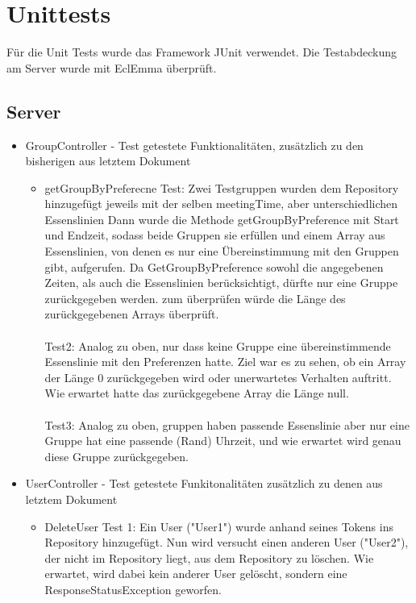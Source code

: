 \documentclass[a4paper]{scrreprt}
\begin{document}
\chapter{Unittests}
Für die Unit Tests wurde das Framework JUnit verwendet. Die Testabdeckung am Server wurde mit EclEmma überprüft.

\section{Server}
\begin{itemize}

\item GroupController - Test
getestete Funktionalitäten, zusätzlich zu den bisherigen aus letztem Dokument
\begin{itemize}


\item getGroupByPreferecne
Test: Zwei Testgruppen wurden dem Repository hinzugefügt jeweils mit der selben meetingTime, aber unterschiedlichen Essenslinien
Dann wurde die Methode getGroupByPreference mit Start und Endzeit, sodass beide Gruppen sie erfüllen und einem Array aus Essenslinien, von denen es nur eine Übereinstimmung mit den Gruppen gibt, aufgerufen.
Da GetGroupByPreference sowohl die angegebenen Zeiten, als auch die Essenslinien berücksichtigt, dürfte nur eine Gruppe zurückgegeben werden.
zum überprüfen würde die Länge des zurückgegebenen Arrays überprüft.
\\ \\
Test2: Analog zu oben, nur dass keine Gruppe eine übereinstimmende Essenslinie mit den Preferenzen hatte.
Ziel war es zu sehen, ob ein Array der Länge 0 zurückgegeben wird oder unerwartetes Verhalten auftritt.
Wie erwartet hatte das zurückgegebene Array die Länge null.
\\ \\
Test3: Analog zu oben, gruppen haben passende Essenslinie aber nur eine Gruppe hat eine passende (Rand) Uhrzeit, und wie erwartet wird genau diese Gruppe zurückgegeben.
\end{itemize}

\item UserController - Test 
getestete Funkitonalitäten zusätzlich zu denen aus letztem Dokument

\begin{itemize}

\item DeleteUser
Test 1: Ein User ("User1") wurde anhand seines Tokens ins Repository hinzugefügt. Nun wird versucht einen anderen User ("User2"), der nicht im Repository liegt, aus dem Repository zu löschen. Wie erwartet, wird dabei kein anderer User gelöscht, sondern eine ResponseStatusException geworfen.


\end{itemize}
\end{itemize}
\end{document}
